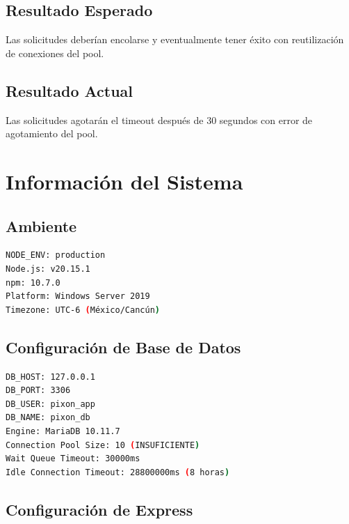 \documentclass[12pt,a4paper]{article}
\begin{document}
\subsection{Resultado Esperado}

Las solicitudes deberían encolarse y eventualmente tener éxito con reutilización de conexiones del pool.

\subsection{Resultado Actual}

Las solicitudes agotarán el timeout después de 30 segundos con error de agotamiento del pool.

\newpage

\section{Información del Sistema}

\subsection{Ambiente}

\begin{lstlisting}[language=bash, caption=Configuración del ambiente]
NODE_ENV: production
Node.js: v20.15.1
npm: 10.7.0
Platform: Windows Server 2019
Timezone: UTC-6 (México/Cancún)
\end{lstlisting}

\subsection{Configuración de Base de Datos}

\begin{lstlisting}[language=bash, caption=Config de MariaDB]
DB_HOST: 127.0.0.1
DB_PORT: 3306
DB_USER: pixon_app
DB_NAME: pixon_db
Engine: MariaDB 10.11.7
Connection Pool Size: 10 (INSUFICIENTE)
Wait Queue Timeout: 30000ms
Idle Connection Timeout: 28800000ms (8 horas)
\end{lstlisting}

\subsection{Configuración de Express}
\end{document}
